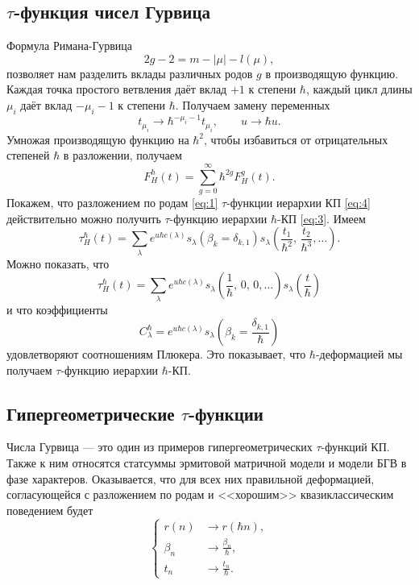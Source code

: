 \documentclass[a4paper,14pt]{extarticle}
\numberwithin{equation}{section}
\begin{document}
\subsection{$\tau$-функция чисел Гурвица}
Формула Римана-Гурвица
\begin{equation}
	2g-2=m-\left| \mu \right| -l(\mu)
,\end{equation} 
позволяет нам разделить вклады различных родов $g$ 
в производящую функцию. Каждая точка простого ветвления
даёт вклад $+1$ к степени $\hbar $, каждый цикл
длины $\mu_i$ даёт вклад $-\mu_i -1$ к степени $\hbar $.
Получаем замену переменных
\begin{equation}
t_{\mu_i}\to  \hbar ^{-\mu_i -1} t_{\mu_i},\qquad
u\to \hbar u
\label{eq:1}
.\end{equation} 
Умножая производящую функцию на $\hbar ^2$, чтобы
избавиться от отрицательных степеней $\hbar $ 
в разложении, получаем
\begin{equation}
	F^\hbar _H(t)=\sum_{g=0}^{\infty} \hbar ^{2g}F_H^g(t)
.\end{equation}
Покажем, что разложением по родам \eqref{eq:1}
 $\tau$-функции иерархии КП \eqref{eq:4} действительно можно
получить $\tau$-функцию иерархии  $\hbar $-КП \eqref{eq:3}.
Имеем
\begin{equation}
	\tau^\hbar _H(t)=
	\sum_{\lambda}^{} e ^{u\hbar c(\lambda)}
	s_\lambda\left( \beta_k =\delta_{k,1} \right) 
	s_\lambda\left( \frac{t_1}{\hbar ^2},\,
	\frac{t_2}{\hbar ^3},\ldots\right) 
.\end{equation}
Можно показать, что
\begin{equation}
	\tau^\hbar _H(t)=
	\sum_{\lambda}^{} e ^{u\hbar c(\lambda)}
	s_\lambda\left( \frac{1}{\hbar },\,0,\,0,\ldots \right) s_\lambda\left( \frac{t}{\hbar } \right) 
\end{equation}
и что коэффициенты
\begin{equation}
	C_\lambda^\hbar = e ^{u\hbar  c(\lambda)}
	s_\lambda \left( \beta_k =\frac{\delta_{k,1}}{\hbar } \right) 
\end{equation}
удовлетворяют соотношениям Плюкера. Это показывает, что $\hbar $-деформацией
мы получаем $\tau$-функцию иерархии $\hbar $-КП. 
\subsection{Гипергеометрические $\tau$-функции}
Числа Гурвица --- это один из примеров гипергеометрических $\tau$-функций КП. Также к ним относятся статсуммы эрмитовой матричной модели и модели БГВ в фазе характеров. Оказывается, что
для всех них правильной деформацией, согласующейся с разложением
по родам и <<хорошим>> квазиклассическим поведением будет
\[
\left\{
\begin{aligned}
	r(n)&\to r\left( \hbar  n \right), \\
	\beta_n&\to \frac{\beta_n}{\hbar },\\
	t_n &\to \frac{t_n}{\hbar }.
\end{aligned}
\right.
\] 
\end{document}
